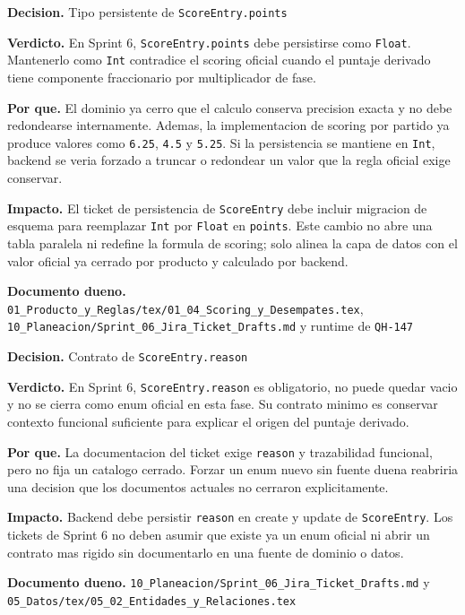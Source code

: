 \begin{docnote}
\textbf{Decision.} Tipo persistente de \texttt{ScoreEntry.points}

\textbf{Verdicto.} En Sprint 6, \texttt{ScoreEntry.points} debe persistirse como \texttt{Float}. Mantenerlo como \texttt{Int} contradice el scoring oficial cuando el puntaje derivado tiene componente fraccionario por multiplicador de fase.

\textbf{Por que.} El dominio ya cerro que el calculo conserva precision exacta y no debe redondearse internamente. Ademas, la implementacion de scoring por partido ya produce valores como \texttt{6.25}, \texttt{4.5} y \texttt{5.25}. Si la persistencia se mantiene en \texttt{Int}, backend se veria forzado a truncar o redondear un valor que la regla oficial exige conservar.

\textbf{Impacto.} El ticket de persistencia de \texttt{ScoreEntry} debe incluir migracion de esquema para reemplazar \texttt{Int} por \texttt{Float} en \texttt{points}. Este cambio no abre una tabla paralela ni redefine la formula de scoring; solo alinea la capa de datos con el valor oficial ya cerrado por producto y calculado por backend.

\textbf{Documento dueno.} \texttt{01\_Producto\_y\_Reglas/tex/01\_04\_Scoring\_y\_Desempates.tex}, \texttt{10\_Planeacion/Sprint\_06\_Jira\_Ticket\_Drafts.md} y runtime de \texttt{QH-147}
\end{docnote}

\begin{docnote}
\textbf{Decision.} Contrato de \texttt{ScoreEntry.reason}

\textbf{Verdicto.} En Sprint 6, \texttt{ScoreEntry.reason} es obligatorio, no puede quedar vacio y no se cierra como enum oficial en esta fase. Su contrato minimo es conservar contexto funcional suficiente para explicar el origen del puntaje derivado.

\textbf{Por que.} La documentacion del ticket exige \texttt{reason} y trazabilidad funcional, pero no fija un catalogo cerrado. Forzar un enum nuevo sin fuente duena reabriria una decision que los documentos actuales no cerraron explicitamente.

\textbf{Impacto.} Backend debe persistir \texttt{reason} en create y update de \texttt{ScoreEntry}. Los tickets de Sprint 6 no deben asumir que existe ya un enum oficial ni abrir un contrato mas rigido sin documentarlo en una fuente de dominio o datos.

\textbf{Documento dueno.} \texttt{10\_Planeacion/Sprint\_06\_Jira\_Ticket\_Drafts.md} y \texttt{05\_Datos/tex/05\_02\_Entidades\_y\_Relaciones.tex}
\end{docnote}

